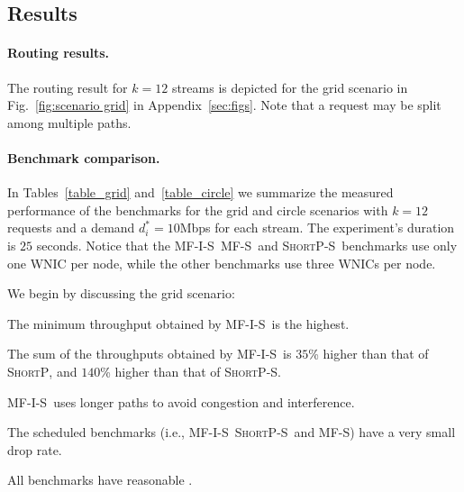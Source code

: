 \documentclass[12pt]{article}
\newenvironment{proof sketch}[1]{\noindent {\emph{Proof sketch of #1:}}}{\hfill \qed}
\newcommand{\PER}{\text{\sc{per}}}
\newcommand{\algA}{\textsc{MF-I-S}}
\newcommand{\algB}{\textsc{ShortP}}
\newcommand{\algBS}{\textsc{ShortP-S}}
\newcommand{\algE}{\textsc{MF-S}}
\newcommand{\algS}{\algB}
\begin{document}
\subsection{Results}

\paragraph{Routing results.}
The routing result for $k=12$ streams is depicted for the grid
scenario in Fig.~\ref{fig:scenario grid} in
Appendix~\ref{sec:figs}. %
Note that a request may be split among multiple paths.

\paragraph{Benchmark comparison.}
In Tables~\ref{table_grid} and~\ref{table_circle} we summarize the
measured performance of the benchmarks for the grid and circle
scenarios with $k=12$ requests and a demand $d^*_i=10$Mbps for each
stream. The experiment's duration is $25$ seconds.
Notice that the \algA\, \algE\, and \algBS\ benchmarks use only one WNIC
per node, while the other benchmarks use three WNICs per node.



We begin by discussing the grid scenario:
\begin{inparaenum}[(1)]
\item The minimum throughput obtained by \algA\ is the highest.
\item The sum of the throughputs obtained by \algA\ is $35$\% higher
  than that of \algS, and $140$\% higher
  than that of \algBS.
\item \algA\ uses longer paths to avoid congestion and interference.
\item The scheduled benchmarks (i.e., \algA\, \algBS\ and \algE ) have a very small drop rate.
\item  All benchmarks have reasonable \PER.
\end{inparaenum}
\end{document}
